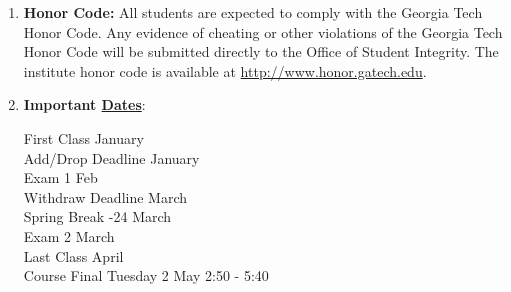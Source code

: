 \documentclass[12pt]{article}
\begin{document}
\begin{small}
\begin{enumerate}[]
\item 
{
\textbf{Honor Code:}
All students are expected to comply with the Georgia Tech Honor Code. Any
evidence of cheating or other violations of the Georgia Tech Honor Code will be
submitted directly to the Office of Student Integrity. The institute honor code is available
at \href{http://www.honor.gatech.edu}{http://www.honor.gatech.edu}.
}




\item \textbf{Important \href{http://www.registrar.gatech.edu/calendar/}{Dates}}:
\begin{flushleft}
First Class  January \\
Add/Drop Deadline  January\\
Exam 1  Feb\\
Withdraw Deadline  March\\
Spring Break -24 March\\
Exam 2  March\\
Last Class  April\\
Course Final \dotfill Tuesday  2 May 2:50 - 5:40
\end{flushleft}

\end{enumerate}



\end{small}
\end{document}
